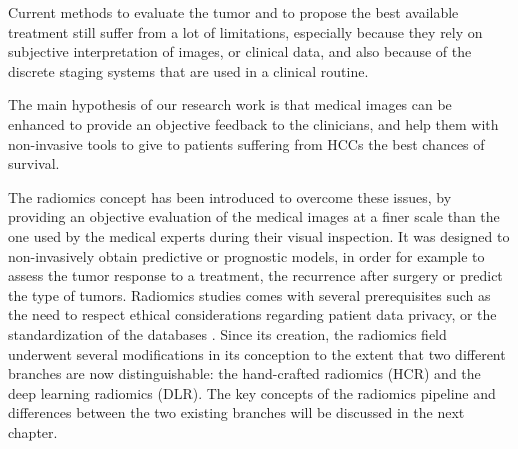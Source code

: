 Current methods to evaluate the tumor and to propose the best available
treatment still suffer from a lot of limitations, especially because
they rely on subjective interpretation of images, or clinical data, and
also because of the discrete staging systems that are used in a clinical
routine.

The main hypothesis of our research work is that medical images can be
enhanced to provide an objective feedback to the clinicians, and help
them with non-invasive tools to give to patients suffering from
HCCs the best chances of survival.

The radiomics concept has been introduced to overcome these issues, by providing an objective evaluation of the medical images at a finer scale than the one used by the medical experts during their visual inspection. 
It was designed to non-invasively obtain predictive or prognostic models, in order for example to assess the tumor response to a treatment, the recurrence after surgery or predict the type of tumors.
Radiomics studies comes with several prerequisites such as the need to respect ethical considerations regarding patient data privacy, or the standardization of the databases \cite{Tang2018}.
Since its creation, the radiomics field underwent several modifications in its conception to the extent that two different branches are now distinguishable: the hand-crafted radiomics (HCR) and the deep learning radiomics (DLR).
The key concepts of the radiomics pipeline and differences between the two existing branches will be discussed in the next chapter.



